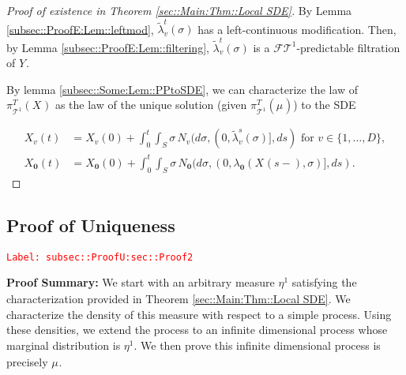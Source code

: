 \documentclass[12pt]{article}
\newcommand{\mc}{\mathcal}
\newcommand{\te}{\text}
\newcommand{\tr}{\textcolor{red}}
\newcommand{\labe}[1]{\tr{\texttt{Label: #1}}}
\newcommand{\pfsum}{\textbf{Proof Summary: }}
\newcommand{\ind}{\hspace{24pt}}
\renewcommand{\root}{\mathbf{0}}				%
\renewcommand{\v}{v}							%
\renewcommand{\S}{S}							%
\newcommand{\s}{\sigma}							%
\newcommand{\T}{T}								%
\renewcommand{\t}{t}							%
\renewcommand{\tt}{s}							%
\newcommand{\F}{\mc{F}}							%
\newcommand{\degr}{D}								%
\newcommand{\poiss}[1]{N_{#1}}						%
\newcommand{\pup}[1]{^{#1}}							%
\newcommand{\tree}{\mc{T}}							%
\newcommand{\piV}[2]{\pi_{#1}^{#2}}					%
\newcommand{\rxvt}[2]{X_{#1}{(#2)}}					%
\newcommand{\rxvts}[2]{X_{#1}{#2}}					%
\newcommand{\rxvtts}[2]{Y_{#1}{#2}}					%
\newcommand{\m}[3]{\mu_{#2#1}^{#3}}						%
\newcommand{\mmm}[3]{\eta_{#2#1}^{#3}}						%
\newcommand{\rate}[1]{\lambda_{#1}}					%
\newcommand{\crate}[2]{\alt{\lambda}_{#1}^{#2}}		%
\newcommand{\alt}{\widetilde}						%
\begin{document}
\begin{proof}[Proof of existence in Theorem \ref{sec::Main:Thm::Local SDE}]
By Lemma \ref{subsec::ProofE:Lem::leftmod}, \(\crate{\v}{\t}(\s)\) has a left-continuous modification. Then, by Lemma \ref{subsec::ProofE:Lem::filtering}, \(\crate{\v}{\t}(\s)\) is a \(\F{\tree\pup{1}}{}\)-predictable filtration of \(\rxvtts{}{}\).

\ind By lemma \ref{subsec::Some:Lem::PPtoSDE}, we can characterize the law of \(\piV{\tree\pup{1}}{\T}(\rxvts{}{})\) as the law of the unique solution (given \(\piV{\tree\pup{1}}{\T}(\m{}{}{})\)) to the SDE

\begin{align*}
\rxvt{\v}{\t} &= \rxvt{\v}{0} + \int_0^\t\int_\S \s\,\poiss{\v}(d\s,(0,\crate{\v}{\tt}(\s)],d\tt) \te{ for } \v \in \{1,\dots,\degr\},\\
\rxvt{\root}{\t} &= \rxvt{\root}{0} + \int_0^\t\int_\S \s\,\poiss{\root}(d\s,(0,\rate{\root}(\rxvt{}{\tt-},\s)],d\tt).
\end{align*}
\end{proof}

\subsection{Proof of Uniqueness}
\label{subsec::ProofU:sec::Proof2}\labe{subsec::ProofU:sec::Proof2}

\pfsum We start with an arbitrary measure \(\mmm{}{}{1}\) satisfying the characterization provided in Theorem \ref{sec::Main:Thm::Local SDE}. We characterize the density of this measure with respect to a simple process. Using these densities, we extend the process to an infinite dimensional process whose marginal distribution is \(\mmm{}{}{1}\). We then prove this infinite dimensional process is precisely \(\m{}{}{}\).
\end{document}
